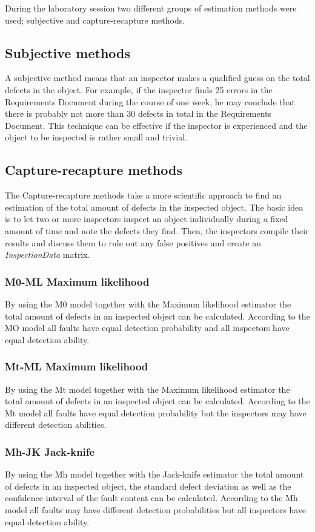 During the laboratory session two different groups of estimation methods were used; subjective and capture-recapture methods. 

\subsection{Subjective methods}
A subjective method means that an inspector makes a qualified guess on the total defects in the object. For example, if the inspector finds 25 errors in the Requirements Document during the course of one week, he may conclude that there is probably not more than 30 defects in total in the Requirements Document. This technique can be effective if the inspector is experienced and the object to be inspected is rather small and trivial.

\subsection{Capture-recapture methods}
The Capture-recapture methods take a more scientific approach to find an estimation of the total amount of defects in the inspected object. The basic idea is to let two or more inspectors inspect an object individually during a fixed amount of time and note the defects they find. Then, the inspectors compile their results and discuss them to rule out any false positives and create an \textit{InspectionData} matrix.

\subsubsection{M0-ML Maximum likelihood}
By using the M0 model together with the Maximum likelihood estimator the total amount of defects in an inspected object can be calculated. 
According to the MO model all faults have equal detection probability and all inspectors have equal detection ability.

\subsubsection{Mt-ML Maximum likelihood}
By using the Mt model together with the Maximum likelihood estimator the total amount of defects in an inspected object can be calculated. 
According to the Mt model all faults have equal detection probability but the inspectors may have different detection abilities.

\subsubsection{Mh-JK Jack-knife}
By using the Mh model together with the Jack-knife estimator the total amount of defects in an inspected object, the standard defect deviation as well as the confidence interval of the fault content can be calculated. 
According to the Mh model all faults may have different detection probabilities but all inspectors have equal detection ability.  
